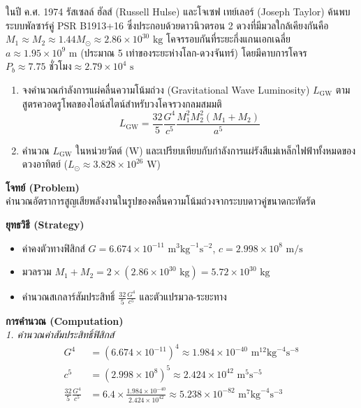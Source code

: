 \begin{psctexample}
ในปี ค.ศ. 1974 รัสเซลล์ ฮัลส์ (Russell Hulse) และโจเซฟ เทย์เลอร์ (Joseph Taylor) ค้นพบระบบพัลซาร์คู่ PSR B1913+16 ซึ่งประกอบด้วยดาวนิวตรอน 2 ดวงที่มีมวลใกล้เคียงกันคือ $M_1 \approx M_2 \approx 1.44 M_\odot \approx 2.86 \times 10^{30}\text{ kg}$ โคจรรอบกันที่ระยะกึ่งแกนเอกเฉลี่ย $a \approx 1.95 \times 10^9\text{ m}$ (ประมาณ 5 เท่าของระยะห่างโลก-ดวงจันทร์) โดยมีคาบการโคจร $P_b \approx 7.75\text{ ชั่วโมง} \approx 2.79 \times 10^4\text{ s}$
\begin{enumerate}
    \item จงคำนวณกำลังการแผ่คลื่นความโน้มถ่วง (Gravitational Wave Luminosity) $L_{\text{GW}}$ ตามสูตรควอดรูโพลของไอน์สไตน์สำหรับวงโคจรวงกลมสมมติ
    \begin{equation}
    L_{\text{GW}} = \frac{32}{5} \frac{G^4}{c^5} \frac{M_1^2 M_2^2 (M_1 + M_2)}{a^5}
    \end{equation}
    \item คำนวณ $L_{\text{GW}}$ ในหน่วยวัตต์ ($\text{W}$) และเปรียบเทียบกับกำลังการแผ่รังสีแม่เหล็กไฟฟ้าทั้งหมดของดวงอาทิตย์ ($L_\odot \approx 3.828 \times 10^{26}\text{ W}$)
\end{enumerate}

\textbf{โจทย์ (Problem)} \\
คำนวณอัตราการสูญเสียพลังงานในรูปของคลื่นความโน้มถ่วงจากระบบดาวคู่ขนาดกะทัดรัด

\textbf{ยุทธวิธี (Strategy)} \\
\begin{itemize}
    \item ค่าคงตัวทางฟิสิกส์ $G = 6.674 \times 10^{-11}\text{ m}^3\text{kg}^{-1}\text{s}^{-2}$, $c = 2.998 \times 10^8\text{ m/s}$
    \item มวลรวม $M_1 + M_2 = 2 \times (2.86 \times 10^{30}\text{ kg}) = 5.72 \times 10^{30}\text{ kg}$
    \item คำนวณสเกลาร์สัมประสิทธิ์ $\frac{32}{5}\frac{G^4}{c^5}$ และตัวแปรมวล-ระยะทาง
\end{itemize}

\textbf{การคำนวณ (Computation)} \\
\textit{1. คำนวณค่าสัมประสิทธิ์ฟิสิกส์}
\begin{align}
G^4 &= (6.674 \times 10^{-11})^4 \approx 1.984 \times 10^{-40}\text{ m}^{12}\text{kg}^{-4}\text{s}^{-8} \nonumber \\
c^5 &= (2.998 \times 10^8)^5 \approx 2.424 \times 10^{42}\text{ m}^5\text{s}^{-5} \nonumber \\
\frac{32}{5} \frac{G^4}{c^5} &= 6.4 \times \frac{1.984 \times 10^{-40}}{2.424 \times 10^{42}} \approx 5.238 \times 10^{-82}\text{ m}^7\text{kg}^{-4}\text{s}^{-3}
\end{align}


\end{psctexample}
